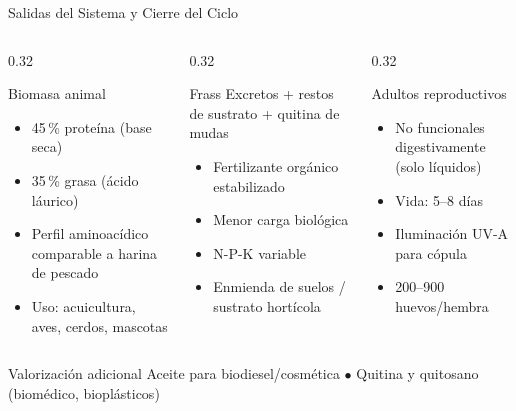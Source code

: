 \documentclass[aspectratio=169, 11pt]{beamer}
\begin{document}
\begin{frame}{Salidas del Sistema y Cierre del Ciclo}
\begin{columns}[T]
\begin{column}{0.32\textwidth}
\begin{block}{Biomasa animal}
\begin{itemize}
    \item 45\,\% proteína (base seca)
    \item 35\,\% grasa (ácido láurico)
    \item Perfil aminoacídico comparable a harina de pescado
    \item Uso: acuicultura, aves, cerdos, mascotas
\end{itemize}
\end{block}
\end{column}
\begin{column}{0.32\textwidth}
\begin{block}{Frass}
Excretos + restos de sustrato + quitina de mudas
\begin{itemize}
    \item Fertilizante orgánico estabilizado
    \item Menor carga biológica
    \item N-P-K variable
    \item Enmienda de suelos / sustrato hortícola
\end{itemize}
\end{block}
\end{column}
\begin{column}{0.32\textwidth}
\begin{block}{Adultos reproductivos}
\begin{itemize}
    \item No funcionales digestivamente (solo líquidos)
    \item Vida: 5--8 días
    \item Iluminación UV-A para cópula
    \item 200--900 huevos/hembra
\end{itemize}
\end{block}
\end{column}
\end{columns}
\vfill
\begin{exampleblock}{Valorización adicional}
Aceite para biodiesel/cosmética \quad $\bullet$ \quad Quitina y quitosano (biomédico, bioplásticos)
\end{exampleblock}
\end{frame}
\end{document}
